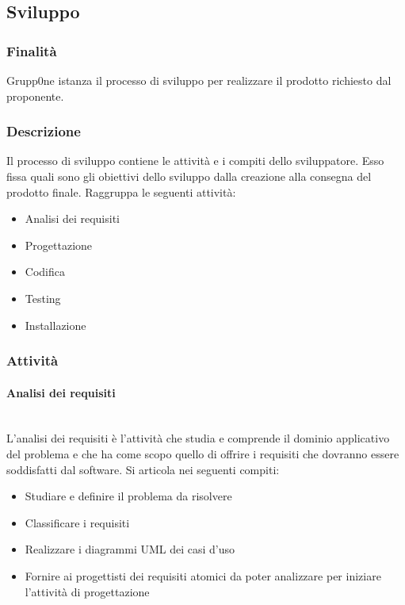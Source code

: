 \documentclass[../norme-di-progetto.tex]{subfiles}
\begin{document}
\subsection{Sviluppo}%
\label{sub:sviluppo}

\subsubsection{Finalità}%
\label{subs:sviluppo/finalita}

Grupp0ne istanza il processo di sviluppo per realizzare il prodotto richiesto dal proponente.

\subsubsection{Descrizione}%
\label{subs:sviluppo/descrizione}

Il processo di sviluppo contiene le attività e i compiti dello sviluppatore. Esso fissa quali sono gli obiettivi dello sviluppo dalla creazione alla consegna del prodotto finale. Raggruppa le seguenti attività:

\begin{itemize}
  \item Analisi dei requisiti
  \item Progettazione
  \item Codifica
  \item Testing
  \item Installazione
\end{itemize}

\subsubsection{Attività}%
\label{subs:attivita}

\paragraph{Analisi dei requisiti}%
\label{par:analisi dei requisiti}
\\L'analisi dei requisiti è l'attività che studia e comprende il dominio applicativo del problema e che ha come scopo quello di offrire i requisiti che dovranno essere soddisfatti dal software. Si articola nei seguenti compiti:

\begin{itemize}
  \item Studiare e definire il problema da risolvere
  \item Classificare i requisiti
  \item Realizzare i diagrammi UML dei casi d'uso
  \item Fornire ai progettisti dei requisiti atomici da poter analizzare per iniziare l'attività di progettazione
\end{itemize}
\end{document}

